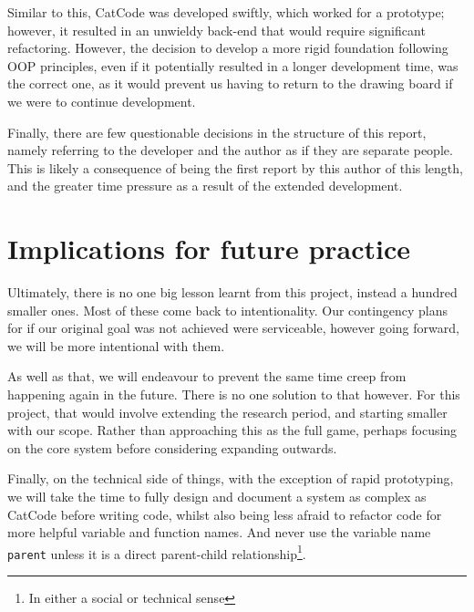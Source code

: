 Similar to this, CatCode was developed swiftly, which worked for a prototype; however, it resulted in an unwieldy back-end that would require significant refactoring. However, the decision to develop a more rigid foundation following OOP principles, even if it potentially resulted in a longer development time, was the correct one, as it would prevent us having to return to the drawing board if we were to continue development.

Finally, there are few questionable decisions in the structure of this report, namely referring to the developer and the author as if they are separate people. This is likely a consequence of being the first report by this author of this length, and the greater time pressure as a result of the extended development.

\section{Implications for future practice}\label{sec:implications}
Ultimately, there is no one big lesson learnt from this project, instead a hundred smaller ones. Most of these come back to intentionality. Our contingency plans for if our original goal was not achieved were serviceable, however going forward, we will be more intentional with them.

As well as that, we will endeavour to prevent the same time creep from happening again in the future. There is no one solution to that however. For this project, that would involve extending the research period, and starting smaller with our scope. Rather than approaching this as the full game, perhaps focusing on the core system before considering expanding outwards.

Finally, on the technical side of things, with the exception of rapid prototyping, we will take the time to fully design and document a system as complex as CatCode before writing code, whilst also being less afraid to refactor code for more helpful variable and function names. And never use the variable name \texttt{parent} unless it is a direct parent-child relationship\footnote{In either a social or technical sense}.